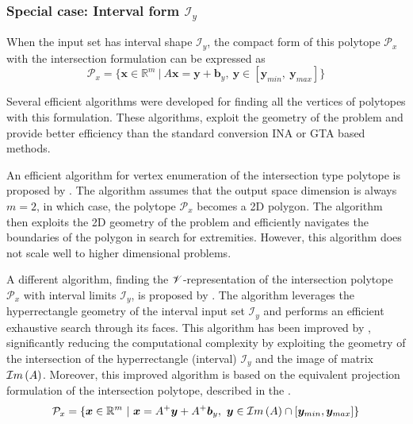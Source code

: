 \subsubsection*{Special case: Interval form $\mathcal{I}_y$}
\label{par:intersection_interval_algos_v}

When the input set has interval shape $\mathcal{I}_y$, the compact form of this polytope  $\mathcal{P}_x$ with the intersection formulation can be expressed as
\begin{equation}
    \mathcal{P}_x=\{\bm{x}\in\mathbb{R}^m ~ |~ A\bm{x} = \bm{y} + \bm{b}_y,~ \bm{y} \in [\bm{y}_{min},~  \bm{y}_{max}]  \}
    \label{eq:inter_hyp_revisit}
\end{equation}

Several efficient algorithms were developed for finding all the vertices of polytopes with this formulation. These algorithms, exploit the geometry of the problem and provide better efficiency than the standard conversion INA or GTA based methods.

An efficient algorithm for vertex enumeration of the intersection type polytope is proposed by \citet{gouttefarde_versatile_2015}. The algorithm assumes that the output space dimension is always $m=2$, in which case, the polytope $\mathcal{P}_x$ becomes a 2D polygon. The algorithm then exploits the 2D geometry of the problem and efficiently navigates the boundaries of the polygon in search for extremities. However, this algorithm does not scale well to higher dimensional problems.

A different algorithm, finding the $\mathscr{V}$-representation of the intersection polytope $\mathcal{P}_x$ with interval limits $\mathcal{I}_y$, is proposed by \citet{chiacchio_evaluation_1996}. The algorithm leverages the hyperrectangle geometry of the interval input set $\mathcal{I}_y$ and performs an efficient exhaustive search through its faces. This algorithm has been improved by \citet{sasaki2011vertex}, significantly reducing the computational complexity by exploiting the geometry of the intersection of the hyperrectangle (interval) $\mathcal{I}_y$ and the image of matrix $\mathcal{I}m\left(A\right)$. Moreover, this improved algorithm is based on the equivalent projection formulation of the intersection polytope, described in the .
\begin{equation}
\mathcal{P}_x=\{\bm{x}\in\mathbb{R}^m ~|~ \bm{x} = A^+\bm{y} + A^+\bm{b}_y,~ \bm{y} \in \mathcal{I}m\left(A\right)\cap[\bm{y}_{min},\bm{y}_{max}]\}
\label{eq:inter_hyp_inter}
\end{equation}

